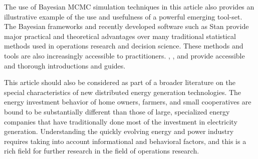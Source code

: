 \documentclass[a4paper]{article}
\begin{document}
The use of Bayesian MCMC simulation techniques in this article also provides an illustrative example of the use and usefulness of a powerful emerging tool-set. The Bayesian frameworks and recently developed software such as Stan provide major practical and theoretical advantages over many traditional statistical methods used in operations research and decision science. These methods and tools are also increasingly accessible to practitioners. \citet{kruschke_doing_2014}, \citet{mcelreath_statistical_2015}, \citet{gelman_bayesian_2013} and \citet{stan_development_team_stan_2014} provide accessible and thorough introductions and guides.

This article should also be considered as part of a broader literature on the special characteristics of new distributed energy generation technologies. The energy investment behavior of home owners, farmers, and small cooperatives are bound to be substantially different than those of large, specialized energy companies that have traditionally done most of the investment in electricity generation. Understanding the quickly evolving energy and power industry requires taking into account informational and behavioral factors, and this is a rich field for further research in the field of operations research.





\end{document}

